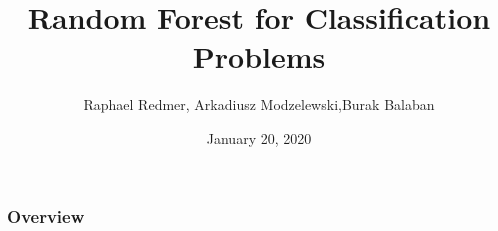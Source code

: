 \documentclass{beamer}
\title{Random Forest for Classification Problems} %
\author[Redmer, Modzelewski, Balaban]{Raphael Redmer, Arkadiusz Modzelewski,\newline Burak Balaban}
\institute[Uni Bonn]{University of Bonn \\ Research Module in Econometrics and Statistics}
\date{January 20, 2020} %
\begin{document}
\begin{frame}
    \titlepage %
\end{frame}

\begin{frame}
\frametitle{Overview} %
\tableofcontents %
\end{frame}


%


















\end{document}
